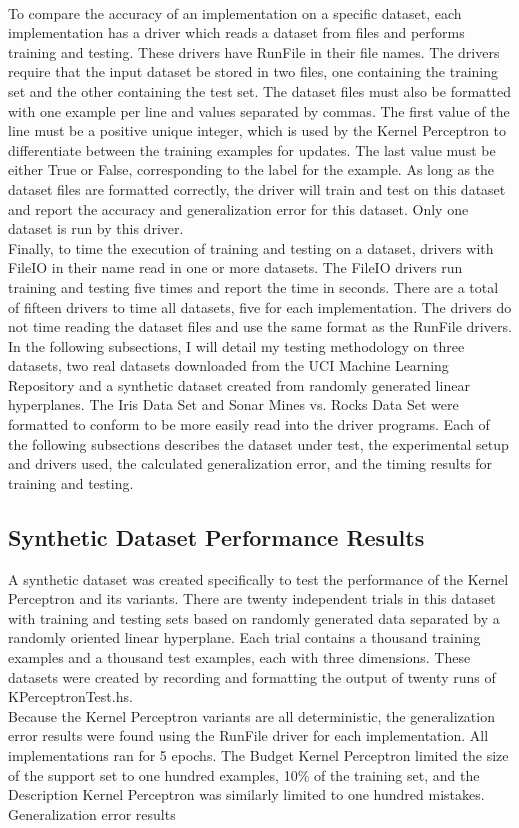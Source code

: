 \\To compare the accuracy of an implementation on a specific dataset, each implementation has a driver which reads a dataset from files and performs training and testing. These drivers have RunFile in their file names. The drivers require that the input dataset be stored in two files, one containing the training set and the other containing the test set. The dataset files must also be formatted with one example per line and values separated by commas. The first value of the line must be a positive unique integer, which is used by the Kernel Perceptron to differentiate between the training examples for updates. The last value must be either True or False, corresponding to the label for the example. As long as the dataset files are formatted correctly, the driver will train and test on this dataset and report the accuracy and generalization error for this dataset. Only one dataset is run by this driver.
\\Finally, to time the execution of training and testing on a dataset, drivers with FileIO in their name read in one or more datasets. The FileIO drivers run training and testing five times and report the time in seconds. There are a total of fifteen drivers to time all datasets, five for each implementation. The drivers do not time reading the dataset files and use the same format as the RunFile drivers. 
\\In the following subsections, I will detail my testing methodology on three datasets, two real datasets downloaded from the UCI Machine Learning Repository \cite{DG17} and a synthetic dataset created from randomly generated linear hyperplanes. The Iris Data Set \cite{Fis36} and Sonar Mines vs. Rocks Data Set \cite{SG88} were formatted to conform to be more easily read into the driver programs. Each of the following subsections describes the dataset under test, the experimental setup and drivers used, the calculated generalization error, and the timing results for training and testing.
\subsection{Synthetic Dataset Performance Results}\label{SyntheticResults}
A synthetic dataset was created specifically to test the performance of the Kernel Perceptron and its variants. There are twenty independent trials in this dataset with training and testing sets based on randomly generated data separated by a randomly oriented linear hyperplane. Each trial contains a thousand training examples and a thousand test examples, each with three dimensions. These datasets were created by recording and formatting the output of twenty runs of KPerceptronTest.hs. 
\\Because the Kernel Perceptron variants are all deterministic, the generalization error results were found using the RunFile driver for each implementation. All implementations ran for 5 epochs. The Budget Kernel Perceptron limited the size of the support set to one hundred examples, 10\% of the training set, and the Description Kernel Perceptron was similarly limited to one hundred mistakes. 
\\Generalization error results

